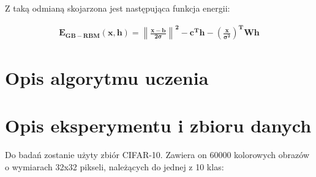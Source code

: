 \documentclass[a4paper,10pt]{article} %
\begin{document}
Z taką odmianą skojarzona jest następująca funkcja energii:

\begin{align}
	\mathbf{E_{GB-RBM}(x,h) = \left\| \frac{x - b}{2 \sigma} \right\| ^2 - c^Th - \left( \frac{x}{\sigma^2} \right) ^TWh}
\end{align}

\section{Opis algorytmu uczenia}

\section{Opis eksperymentu i  zbioru danych}
Do badań zostanie użyty zbiór CIFAR-10. Zawiera on 60000 kolorowych obrazów o wymiarach 32x32 pikseli, należących do jednej z 10 klas: 
\end{document}
